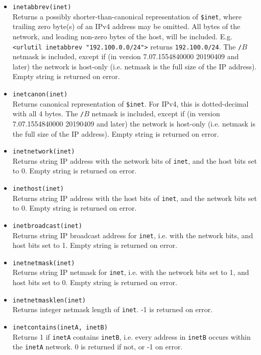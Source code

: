 \begin{itemize}
  \item \verb`inetabbrev(inet)` \\

    Returns a possibly shorter-than-canonical representation of
    \verb`$inet`, where trailing zero byte(s) of an IPv4 address may
    be omitted.  All bytes of the network, and leading non-zero bytes
    of the host, will be included.  E.g.  {\tt <urlutil inetabbrev
      "192.100.0.0/24">} returns {\tt 192.100.0/24}.  The {\tt /}$B$
    netmask is included, except if (in version 7.07.1554840000
    20190409 and later) the network is host-only (i.e. netmask is the
    full size of the IP address).  Empty string is returned on error.

  \item \verb`inetcanon(inet)` \\

    Returns canonical representation of \verb`$inet`.  For IPv4, this
    is dotted-decimal with all 4 bytes.
    The {\tt /}$B$ netmask is included, except if (in version
    7.07.1554840000 20190409 and later) the network is host-only
    (i.e. netmask is the full size of the IP address).  Empty string
    is returned on error.

  \item \verb`inetnetwork(inet)` \\
    Returns string IP address with the network bits of \verb`inet`,
    and the host bits set to 0.  Empty string is returned on error.

  \item \verb`inethost(inet)` \\
    Returns string IP address with the host bits of \verb`inet`,
    and the network bits set to 0.  Empty string is returned on error.

  \item \verb`inetbroadcast(inet)` \\
    Returns string IP broadcast address for \verb`inet`, i.e. with
    the network bits, and host bits set to 1.  Empty string is
    returned on error.

  \item \verb`inetnetmask(inet)` \\
    Returns string IP netmask for \verb`inet`, i.e. with the
    network bits set to 1, and host bits set to 0.  Empty string is
    returned on error.

  \item \verb`inetnetmasklen(inet)` \\
    Returns integer netmask length of \verb`inet`.  -1 is returned
    on error.
  \item \verb`inetcontains(inetA, inetB)` \\
    Returns 1 if \verb`inetA` contains \verb`inetB`, i.e. every
    address in \verb`inetB` occurs within the \verb`inetA` network.
    0 is returned if not, or -1 on error.


\end{itemize}
